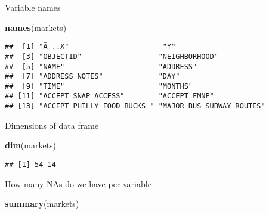 \documentclass[]{article}
\newenvironment{Shaded}{\begin{snugshade}}{\end{snugshade}}
\newcommand{\KeywordTok}[1]{\textcolor[rgb]{0.13,0.29,0.53}{\textbf{#1}}}
\newcommand{\NormalTok}[1]{#1}
\begin{document}
Variable names

\begin{Shaded}
\begin{Highlighting}[]
\KeywordTok{names}\NormalTok{(markets)}
\end{Highlighting}
\end{Shaded}

\begin{verbatim}
##  [1] "Ã¯..X"                      "Y"                        
##  [3] "OBJECTID"                  "NEIGHBORHOOD"             
##  [5] "NAME"                      "ADDRESS"                  
##  [7] "ADDRESS_NOTES"             "DAY"                      
##  [9] "TIME"                      "MONTHS"                   
## [11] "ACCEPT_SNAP_ACCESS"        "ACCEPT_FMNP"              
## [13] "ACCEPT_PHILLY_FOOD_BUCKS_" "MAJOR_BUS_SUBWAY_ROUTES"
\end{verbatim}

Dimensions of data frame

\begin{Shaded}
\begin{Highlighting}[]
\KeywordTok{dim}\NormalTok{(markets)}
\end{Highlighting}
\end{Shaded}

\begin{verbatim}
## [1] 54 14
\end{verbatim}

How many NAs do we have per variable

\begin{Shaded}
\begin{Highlighting}[]
\KeywordTok{summary}\NormalTok{(markets)}
\end{Highlighting}
\end{Shaded}
\end{document}
